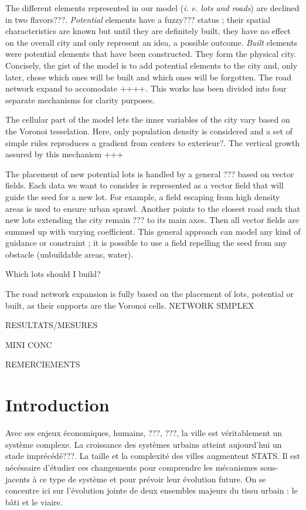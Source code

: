 \documentclass[12pt]{article}
\begin{document}
The different elements represented in our model (\textit{i. e. lots
  and roads}) are declined in two flavors???. \textit{Potential}
elements have a fuzzy??? status ; their spatial characteristics are
known but until they are definitely built, they have no effect on the
overall city and only represent an idea, a possible
outcome. \textit{Built} elements were potential elements that have
been constructed. They form the physical city. Concisely, the gist of
the model is to add potential elements to the city and, only later,
chose which ones will be built and which ones will be forgotten. The
road network expand to accomodate ++++. This works has been divided
into four separate mechanisms for clarity purposes.

The cellular part of the model lets the inner variables of the city
vary based on the Voronoi tesselation. Here, only population density
is considered and a set of simple rules reproduces a gradient from
centers to exterieur?. The vertical growth assured by this mechanism
+++

The placement of new potential lots is handled by a general ??? based
on vector fields. Each data we want to consider is represented as a
vector field that will guide the seed for a new lot. For example, a
field escaping from high density areas is used to ensure urban
sprawl. Another points to the closest road such that new lots
extending the city remain ??? to its main axes. Then all vector fields
are summed up with varying coefficient. This general approach can
model any kind of guidance or constraint ; it is possible to use a
field repelling the seed from any obstacle (unbuildable areas, water).

Which lots should I build?

The road network expansion is fully based on the placement of lots,
potential or built, as their supports are the Voronoi cells. NETWORK
SIMPLEX

RESULTATS/MESURES

MINI CONC

\newpage

\tableofcontents

\newpage

REMERCIEMENTS

\newpage

\section{Introduction}

Avec ses enjeux économiques, humains, ???, ???, la ville est
véritablement un système complexe. La croissance des systèmes urbains
atteint aujourd'hui un stade imprécédé???. La taille et la complexité
des villes augmentent STATS. Il est nécéssaire d'étudier ces
changements pour comprendre les mécanismes sous-jacents à ce type de
système et pour prévoir leur évolution future. On se concentre ici sur
l'évolution jointe de deux ensembles majeurs du tissu urbain : le bâti
et le viaire.
\end{document}
